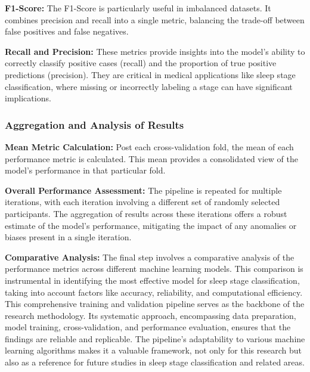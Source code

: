 \documentclass[12pt, a4paper,oneside]{book}
\numberwithin{equation}{section}
\begin{document}
\textbf{F1-Score: }The F1-Score is particularly useful in imbalanced datasets. It combines precision and recall into a single metric, balancing the trade-off between false positives and false negatives.

\textbf{Recall and Precision:} These metrics provide insights into the model's ability to correctly classify positive cases (recall) and the proportion of true positive predictions (precision). They are critical in medical applications like sleep stage classification, where missing or incorrectly labeling a stage can have significant implications.
\subsubsection{Aggregation and Analysis of Results}
\textbf{Mean Metric Calculation:} Post each cross-validation fold, the mean of each performance metric is calculated. This mean provides a consolidated view of the model's performance in that particular fold.

\textbf{Overall Performance Assessment:} The pipeline is repeated for multiple iterations, with each iteration involving a different set of randomly selected participants. The aggregation of results across these iterations offers a robust estimate of the model's performance, mitigating the impact of any anomalies or biases present in a single iteration.

\textbf{Comparative Analysis:} The final step involves a comparative analysis of the performance metrics across different machine learning models. This comparison is instrumental in identifying the most effective model for sleep stage classification, taking into account factors like accuracy, reliability, and computational efficiency.
\newline\newline
This comprehensive training and validation pipeline serves as the backbone of the research methodology. Its systematic approach, encompassing data preparation, model training, cross-validation, and performance evaluation, ensures that the findings are reliable and replicable. The pipeline's adaptability to various machine learning algorithms makes it a valuable framework, not only for this research but also as a reference for future studies in sleep stage classification and related areas.
\end{document}
